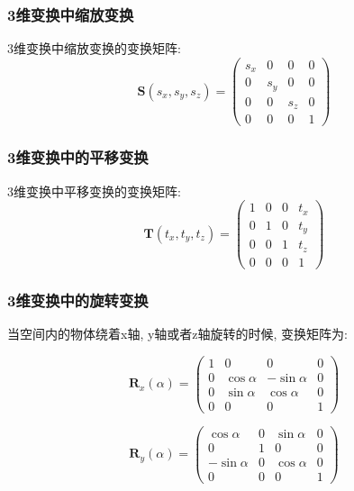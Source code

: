 \documentclass[openany]{progbookcn}
\begin{document}
\subsubsection{3维变换中缩放变换}
3维变换中缩放变换的变换矩阵: 
\begin{equation}
	\textbf{S}(s_x,s_y,s_z)=\begin{pmatrix}s_x&0&0&0\\0&s_y&0&0\\0&0&s_z&0\\0&0&0&1\end{pmatrix}
\end{equation}

\subsubsection{3维变换中的平移变换}
3维变换中平移变换的变换矩阵: 
\begin{equation}
	\textbf{T}(t_x,t_y,t_z)=\begin{pmatrix}1&0&0&t_x\\0&1&0&t_y\\0&0&1&t_z\\0&0&0&1\end{pmatrix}
\end{equation}

\subsubsection{3维变换中的旋转变换}

当空间内的物体绕着x轴, y轴或者z轴旋转的时候, 变换矩阵为: 

\begin{equation}
\textbf{R}_x(\alpha)=\begin{pmatrix}1&0&0&0\\0&\cos\alpha&-\sin\alpha&0\\0&\sin\alpha&\cos\alpha&0\\0&0&0&1\end{pmatrix}
\end{equation}

\begin{equation}
	\textbf{R}_y(\alpha)=\begin{pmatrix}\cos\alpha&0&\sin\alpha&0\\0&1&0&0\\-\sin\alpha&0&\cos\alpha&0\\0&0&0&1\end{pmatrix}
\end{equation}
\end{document}
